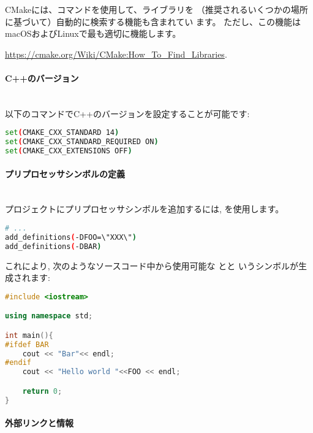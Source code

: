 \documentclass[11pt,a4paper,landscape]{ltjsarticle}
\newcommand{\sectiontitle}[1]{\paragraph{#1} \ \\} %
\begin{document}
\begin{multicols}{2}
CMakeには、コマンドを使用して、ライブラリを
（推奨されるいくつかの場所に基づいて）自動的に検索する機能も含まれてい
ます。 ただし、この機能はmacOSおよびLinuxで最も適切に機能します。

\url{https://cmake.org/Wiki/CMake:How_To_Find_Libraries}.

\sectiontitle{C++のバージョン}

以下のコマンドでC++のバージョンを設定することが可能です:

\begin{lstlisting}[language=bash]
set(CMAKE_CXX_STANDARD 14)
set(CMAKE_CXX_STANDARD_REQUIRED ON)
set(CMAKE_CXX_EXTENSIONS OFF)
\end{lstlisting}

\sectiontitle{プリプロセッサシンボルの定義}

プロジェクトにプリプロセッサシンボルを追加するには,
 を使用します。

\begin{lstlisting}[language=bash]
# ...
add_definitions(-DFOO=\"XXX\")
add_definitions(-DBAR)
\end{lstlisting}

これにより, 次のようなソースコード中から使用可能な とと
いうシンボルが生成されます:

\begin{lstlisting}[language=c++]
#include <iostream>

using namespace std;

int main(){
#ifdef BAR
    cout << "Bar"<< endl;
#endif
    cout << "Hello world "<<FOO << endl;

    return 0;
}
\end{lstlisting}

\vspace{\baselineskip} %


\sectiontitle{外部リンクと情報}


\end{multicols}
\end{document}
